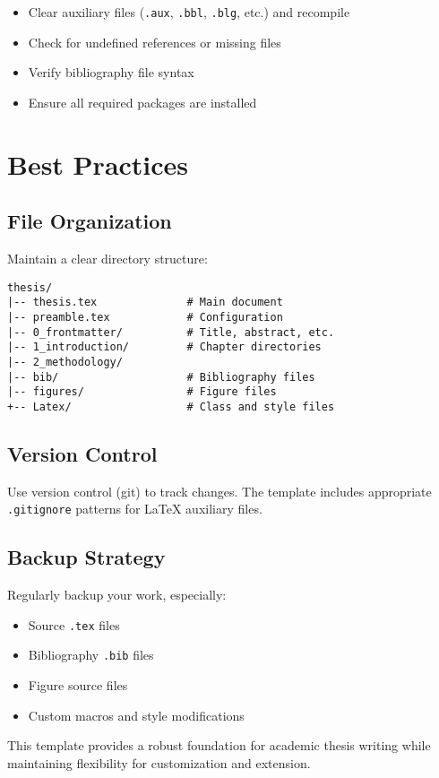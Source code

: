 \begin{itemize}
    \item Clear auxiliary files (\texttt{.aux}, \texttt{.bbl}, \texttt{.blg}, etc.) and recompile
    \item Check for undefined references or missing files
    \item Verify bibliography file syntax
    \item Ensure all required packages are installed
\end{itemize}

\section{Best Practices}
\label{sect:best-practices}

\subsection{File Organization}
\label{sect:file-organization}

Maintain a clear directory structure:

\begin{lstlisting}[basicstyle=\ttfamily\footnotesize]
thesis/
|-- thesis.tex              # Main document
|-- preamble.tex            # Configuration
|-- 0_frontmatter/          # Title, abstract, etc.
|-- 1_introduction/         # Chapter directories
|-- 2_methodology/
|-- bib/                    # Bibliography files
|-- figures/                # Figure files
+-- Latex/                  # Class and style files
\end{lstlisting}

\subsection{Version Control}
\label{sect:version-control}

Use version control (git) to track changes. The template includes appropriate \texttt{.gitignore} patterns for LaTeX auxiliary files.

\subsection{Backup Strategy}
\label{sect:backup-strategy}

Regularly backup your work, especially:
\begin{itemize}
    \item Source \texttt{.tex} files
    \item Bibliography \texttt{.bib} files  
    \item Figure source files
    \item Custom macros and style modifications
\end{itemize}

This template provides a robust foundation for academic thesis writing while maintaining flexibility for customization and extension.